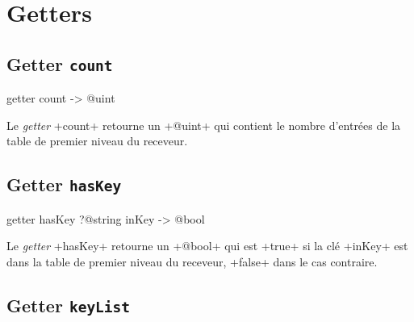 \section{Getters}

%
%

\subsection{Getter \texttt{count}}

\begin{galgascode}
getter count -> @uint
\end{galgascode}


Le \emph{getter} \ggs+count+ retourne un \ggs+@uint+ qui contient le nombre d'entrées de la table de premier niveau du receveur.



\subsection{Getter \texttt{hasKey}}

\begin{galgascode}
getter hasKey ?@string inKey -> @bool
\end{galgascode}


Le \emph{getter} \ggs+hasKey+ retourne un \ggs+@bool+ qui est \ggs+true+ si la clé \ggs+inKey+ est dans la table de premier niveau du receveur, \ggs+false+ dans le cas contraire.



\subsection{Getter \texttt{keyList}}

